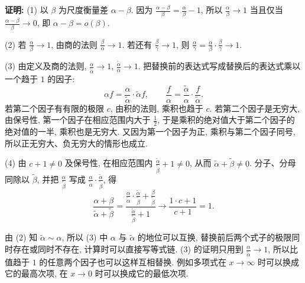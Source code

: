 \documentclass[UTF8,openany]{ctexbook}
\theoremstyle{chinesetextbook}
\newenvironment{cnproof}{\par\indent\textbf{证明:} \ignorespaces}{\par}
\begin{document}
\begin{cnproof}
(1) 以 $\beta$ 为尺度衡量差 $\alpha-\beta$. 因为 $\displaystyle\frac{\alpha-\beta}\beta=\frac\alpha\beta-1$, 所以 $\displaystyle\frac\alpha\beta\to1$ 当且仅当 $\displaystyle\frac{\alpha-\beta}\beta\to0$, 即 $\alpha-\beta=o(\beta)$.

(2) 若 $\displaystyle\frac\alpha\beta\to1$, 由商的法则 $\displaystyle\frac\beta\alpha\to1$. 若还有 $\displaystyle\frac\beta\gamma\to1$, 则 $\displaystyle\frac\alpha\gamma=\frac\alpha\beta\cdot\frac\beta\gamma\to1$.

(3) 由定义及商的法则, $\displaystyle\frac\alpha{\widetilde\alpha}\to1$, $\displaystyle\frac{\widetilde\alpha}\alpha\to1$. 把替换前的表达式写成替换后的表达式乘以一个趋于 $1$ 的因子:
\[
\alpha f=\frac\alpha{\widetilde\alpha}\cdot\widetilde\alpha f,\qquad\frac f\alpha=\frac{\widetilde\alpha}\alpha\cdot\frac f{\widetilde\alpha}.
\]
若第二个因子有有限的极限 $c$, 由积的法则, 乘积也趋于 $c$. 若第二个因子是无穷大, 由保号性, 第一个因子在相应范围内大于 $\displaystyle\frac12$, 于是乘积的绝对值大于第二个因子的绝对值的一半, 乘积也是无穷大. 又因为第一个因子为正, 乘积与第二个因子同号, 所以正无穷大、负无穷大的情形也成立.

(4) 由 $c+1\ne0$ 及保号性, 在相应范围内 $\displaystyle\frac{\widetilde\alpha}{\widetilde\beta}+1\ne0$, 从而 $\widetilde\alpha+\widetilde\beta\ne0$. 分子、分母同除以 $\widetilde\beta$, 并把 $\displaystyle\frac\alpha{\widetilde\beta}$ 写成 $\displaystyle\frac\alpha{\widetilde\alpha}\cdot\frac{\widetilde\alpha}{\widetilde\beta}$, 得
\[
\frac{\alpha+\beta}{\widetilde\alpha+\widetilde\beta}=\frac{\frac\alpha{\widetilde\alpha}\cdot\frac{\widetilde\alpha}{\widetilde\beta}+\frac\beta{\widetilde\beta}}{\frac{\widetilde\alpha}{\widetilde\beta}+1}\to\frac{1\cdot c+1}{c+1}=1.
\]
\end{cnproof}
由 (2) 知 $\widetilde\alpha\sim\alpha$, 所以 (3) 中 $\alpha$ 与 $\widetilde\alpha$ 的地位可以互换, 替换前后两个式子的极限同时存在或同时不存在, 计算时可以直接写等式链. (3) 的证明只用到 $\displaystyle\frac\alpha{\widetilde\alpha}\to1$, 所以比值趋于 $1$ 的任意两个因子也可以这样互相替换. 例如多项式在 $x\to\infty$ 时可以换成它的最高次项, 在 $x\to0$ 时可以换成它的最低次项.
\end{document}
